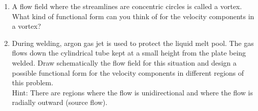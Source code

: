 \begin{enumerate}
\item A flow field where the streamlines are concentric circles is called a vortex. What kind of functional form can you think of for the velocity components in a vortex?
 
\item During welding, argon gas jet is used to protect the liquid melt pool. The gas flows down the cylindrical tube kept at a small height from the plate being welded. Draw schematically the flow field for this situation and design a possible functional form for the velocity components in different regions of this problem.\\ Hint: There are regions where the flow is unidirectional and where the flow is radially outward (source flow). 

\end{enumerate}

